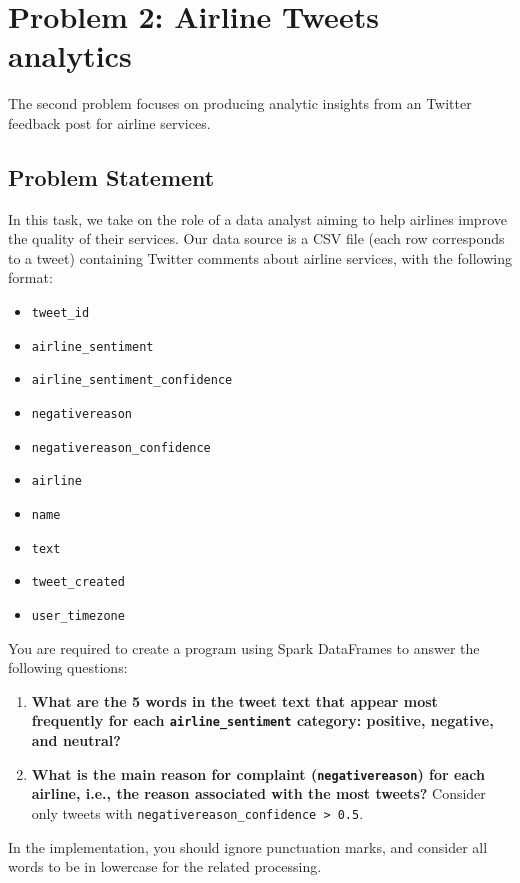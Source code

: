 \documentclass[acmlarge]{acmart}
\begin{document}
  \section{Problem 2: Airline Tweets analytics}
  \label{sec:problem2}
  The second problem focuses on producing analytic insights from an Twitter feedback post for airline services.


  \subsection{Problem Statement}
  In this task, we take on the role of a data analyst aiming to help airlines improve the quality of their services. Our data source is a CSV file (each row corresponds to a tweet) containing Twitter comments about airline services, with the following format:

  \begin{itemize}
    \item \texttt{tweet\_id}
    \item \texttt{airline\_sentiment}
    \item \texttt{airline\_sentiment\_confidence}
    \item \texttt{negativereason}
    \item \texttt{negativereason\_confidence}
    \item \texttt{airline}
    \item \texttt{name}
    \item \texttt{text}
    \item \texttt{tweet\_created}
    \item \texttt{user\_timezone}
  \end{itemize}

  You are required to create a program using Spark DataFrames to answer the following questions:

  \begin{enumerate}
    \item \textbf{What are the 5 words in the tweet text that appear most frequently for each \texttt{airline\_sentiment} category: positive, negative, and neutral?}
    \item \textbf{What is the main reason for complaint (\texttt{negativereason}) for each airline, i.e., the reason associated with the most tweets?} Consider only tweets with \texttt{negativereason\_confidence > 0.5}.
  \end{enumerate}

  In the implementation, you should ignore punctuation marks, and consider all words to be in lowercase for the related processing.
\end{document}
